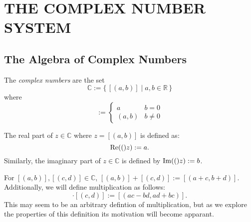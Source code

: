 \documentclass{refbook}
\begin{document}
\section{THE COMPLEX NUMBER SYSTEM}
\subsection{The Algebra of Complex Numbers}
\begin{definition} 
\label{def:cmpnum}
The \emph{complex numbers} are the set
\begin{equation*}
\mathbb{C} := \{\,[(a,b)] \mid a,b \in \mathbb{R}\,\}
\end{equation*}
where
\begin{equation*}
[(a,b)] :=
\begin{cases}
a & b = 0 \\
(a,b) & b \neq 0
\end{cases}
\end{equation*}
\end{definition}
\begin{definition} 
The real part of $z \in \mathbb{C}$ where $z=[(a,b)]$ is defined as:
\begin{equation*}
\operatorname{Re}({(})z) := a.
\end{equation*}
Similarly, the imaginary part of $z \in \mathbb{C}$ is defined by $\operatorname{Im}({(})z):=b$.
\end{definition}
\begin{definition} 
For $[(a,b)],[(c,d)]\in \mathbb{C}$, $[(a,b)]+[(c,d)]:=[(a+c,b+d)]$. Additionally, we will define multiplication as follows:
\begin{equation*}
[(a,b)]\cdot[(c,d)] := [(ac - bd, ad + bc)].
\end{equation*}
This may seem to be an arbitrary defintion of multiplication, but as we explore the properties of this definition its motivation will become apparant.
\end{definition}
\end{document}
